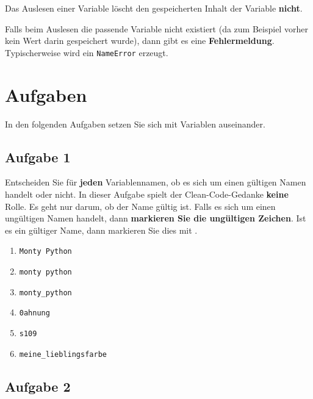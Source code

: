 \begin{important}
	Das Auslesen einer Variable löscht den gespeicherten Inhalt der Variable \textbf{nicht}.
\end{important}

\begin{hinweis}
	Falls beim Auslesen die passende Variable nicht existiert (da zum Beispiel vorher kein Wert darin gespeichert wurde), dann gibt es eine \textbf{Fehlermeldung}. Typischerweise wird ein \texttt{NameError} erzeugt.
\end{hinweis}


\section{Aufgaben}

In den folgenden Aufgaben setzen Sie sich mit Variablen auseinander.

\subsection{Aufgabe 1}

Entscheiden Sie für \textbf{jeden} Variablennamen, ob es sich um einen gültigen Namen handelt oder nicht. In dieser Aufgabe spielt der Clean-Code-Gedanke \textbf{keine} Rolle. Es geht nur darum, ob der Name gültig ist. Falls es sich um einen ungültigen Namen handelt, dann \textbf{markieren Sie die ungültigen Zeichen}. Ist es ein gültiger Name, dann markieren Sie dies mit \checkmark.

\begin{multicols}{2}
\begin{enumerate}
\item \lstinline{Monty Python}
\item \lstinline{monty python}
\item \lstinline{monty_python}
\item \lstinline{0ahnung}
\item \lstinline{s109}
\item \lstinline{meine_lieblingsfarbe}
\end{enumerate}
\end{multicols}

\subsection{Aufgabe 2}

